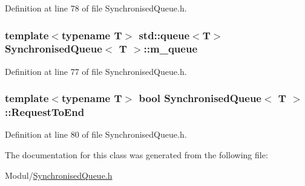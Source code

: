 \-Definition at line 78 of file \-Synchronised\-Queue.\-h.

\hypertarget{classSynchronisedQueue_a838ae9b5d2b5ce8dd901aa7a03c79861}{
\subsubsection[{m\-\_\-queue}]{\setlength{\rightskip}{0pt plus 5cm}template$<$typename \-T$>$ std\-::queue$<$\-T$>$ {\bf \-Synchronised\-Queue}$<$ \-T $>$\-::{\bf m\-\_\-queue}}}\label{classSynchronisedQueue_a838ae9b5d2b5ce8dd901aa7a03c79861}


\-Definition at line 77 of file \-Synchronised\-Queue.\-h.

\hypertarget{classSynchronisedQueue_af7a6fdab054a96999a930575cd62928f}{
\subsubsection[{\-Request\-To\-End}]{\setlength{\rightskip}{0pt plus 5cm}template$<$typename \-T$>$ bool {\bf \-Synchronised\-Queue}$<$ \-T $>$\-::{\bf \-Request\-To\-End}}}\label{classSynchronisedQueue_af7a6fdab054a96999a930575cd62928f}


\-Definition at line 80 of file \-Synchronised\-Queue.\-h.



\-The documentation for this class was generated from the following file\-:\begin{DoxyCompactItemize}
\item 
\-Modul/\hyperlink{SynchronisedQueue_8h}{\-Synchronised\-Queue.\-h}\end{DoxyCompactItemize}
